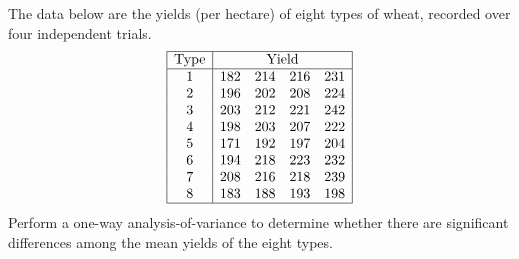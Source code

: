 \begin{example}
The data below are the yields (per hectare) of eight types of wheat, recorded over four independent trials. 
\[
\begin{array}{|c|cccc|}\hline
\text{Type}	& \multicolumn{4}{c|}{\text{Yield}} \\ \hline
1 &  182 & 214 & 216 & 231 \\
2 &  196 & 202 & 208 & 224 \\
3 &  203 & 212 & 221 & 242 \\
4 &  198 & 203 & 207 & 222 \\
5 &  171 & 192 & 197 & 204 \\
6 &  194 & 218 & 223 & 232 \\
7 &  208 & 216 & 218 & 239 \\
8 &  183 & 188 & 193 & 198 \\ \hline
\end{array}
\]
Perform a one-way analysis-of-variance to determine whether there are significant differences among the mean yields of the eight types.
\end{example}

